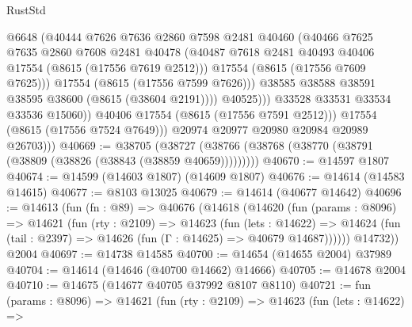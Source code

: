 \begin{lexlean}{RustStd}
\begin{coremodule}
                            @6648
                            (@40444
                              @7626
                              @7636
                              @2860
                              @7598
                              @2481
                              @40460
                              (@40466
                                @7625
                                @7635
                                @2860
                                @7608
                                @2481
                                @40478
                                (@40487
                                  @7618
                                  @2481
                                  @40493
                                  @40406
                                  @17554
                                  (@8615 (@17556 @7619 @2512)))
                                @17554
                                (@8615 (@17556 @7609 @7625)))
                              @17554
                              (@8615 (@17556 @7599 @7626)))
                            @38585
                            @38588
                            @38591
                            @38595
                            @38600
                            (@8615 (@38604 @2191))))
                        @40525)))
                  @33528
                  @33531
                  @33534
                  @33536
                  @15060))
              @40406
              @17554
              (@8615 (@17556 @7591 @2512)))
            @17554
            (@8615 (@17556 @7524 @7649)))
          @20974
          @20977
          @20980
          @20984
          @20989
          @26703)))
@40669 := @38705
    (@38727 (@38766 (@38768 (@38770 (@38791 (@38809 (@38826 (@38843 (@38859 @40659)))))))))
@40670 := @14597 @1807
@40674 := @14599 (@14603 @1807) (@14609 @1807)
@40676 := @14614 (@14583 @14615)
@40677 := @8103 @13025
@40679 := @14614 (@40677 @14642)
@40696 := @14613
    (fun (fn : @89) =>
    @40676
      (@14618
        (@14620
          (fun (params : @8096) =>
          @14621
            (fun (rty : @2109) =>
            @14623
              (fun (lets : @14622) =>
              @14624 (fun (tail : @2397) => @14626 (fun (Γ : @14625) => @40679 @14687))))))
        @14732))
    @2004
@40697 := @14738 @14585
@40700 := @14654 (@14655 @2004) @37989
@40704 := @14614 (@14646 (@40700 @14662) @14666)
@40705 := @14678 @2004
@40710 := @14675 (@14677 @40705 @37992 @8107 @8110)
@40721 := fun (params : @8096) =>
  @14621
    (fun (rty : @2109) =>
    @14623
      (fun (lets : @14622) =>

\end{coremodule}
\end{lexlean}
